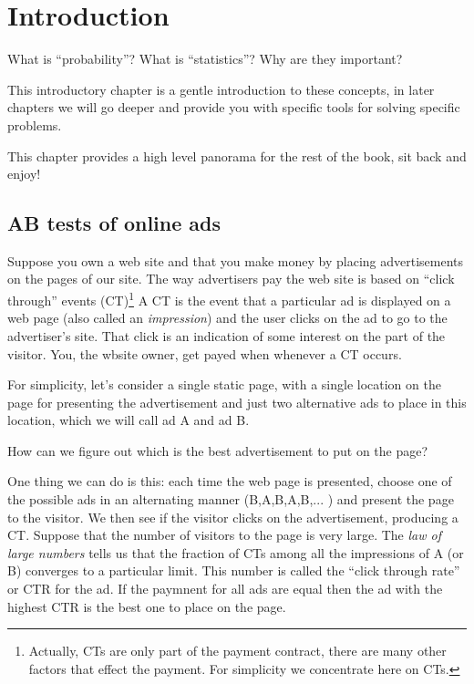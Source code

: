 \chapter{Introduction}

What is ``probability''? What is ``statistics''? Why are they
important?

This introductory chapter is a gentle introduction to these concepts,
in later chapters we will go deeper and provide you with specific
tools for solving specific problems.

This chapter provides a high level panorama for the rest of the book,
sit back and enjoy!

\section{AB tests of online ads}

Suppose you own a web site and that you make money by placing
advertisements on the pages of our site. The way advertisers pay the web
site is based on ``click through'' events (CT)\footnote{Actually, CTs are
  only part of the payment contract, there are many other factors that effect
  the payment. For simplicity we concentrate here on CTs.} 
A CT is the event that a particular ad is displayed on a
web page (also called an {\em impression}) and the user clicks on the
ad to go to the advertiser's site. That click is an indication of some
interest on the part of the visitor. You, the wbsite owner, get
payed when whenever a CT occurs.

For simplicity, let's consider a single static page, with a single
location on the page for presenting the advertisement and just two
alternative ads to place in this location, which we will call ad A and
ad B. 

How can we figure out which is the best advertisement to put on the
page?

One thing we can do is this: each time the web page is presented,
choose one of the possible ads in an alternating manner
(B,A,B,A,B,... ) and present the page to the visitor. We then see if
the visitor clicks on the advertisement, producing a CT. Suppose that
the number of visitors to the page is very large. The {\em law of
  large numbers} tells us that the fraction of CTs among all the
impressions of A (or B) converges to a particular limit.  This number
is called the ``click through rate'' or CTR for the ad. If the
paymnent for all ads are equal then the ad with the highest CTR is the
best one to place on the page.

